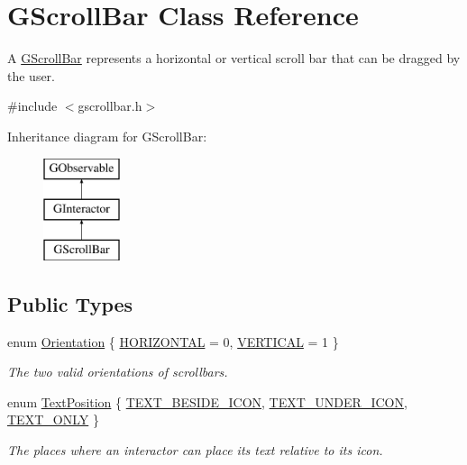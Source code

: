 \hypertarget{classGScrollBar}{}\section{G\+Scroll\+Bar Class Reference}
\label{classGScrollBar}


A \mbox{\hyperlink{classGScrollBar}{G\+Scroll\+Bar}} represents a horizontal or vertical scroll bar that can be dragged by the user.  




{\ttfamily \#include $<$gscrollbar.\+h$>$}

Inheritance diagram for G\+Scroll\+Bar\+:\begin{figure}[H]
\begin{center}
\leavevmode
\includegraphics[height=3.000000cm]{classGScrollBar}
\end{center}
\end{figure}
\subsection*{Public Types}
\begin{DoxyCompactItemize}
\item 
enum \mbox{\hyperlink{classGScrollBar_a871118a09520247c78a71ecd7b0abd58}{Orientation}} \{ \mbox{\hyperlink{classGScrollBar_a871118a09520247c78a71ecd7b0abd58a4dd51ad73508d6fc83a502966779e48e}{H\+O\+R\+I\+Z\+O\+N\+T\+AL}} = 0, 
\mbox{\hyperlink{classGScrollBar_a871118a09520247c78a71ecd7b0abd58a1a88641fcd39f2ed3e58a18526e97138}{V\+E\+R\+T\+I\+C\+AL}} = 1
 \}
\begin{DoxyCompactList}\small\item\em The two valid orientations of scrollbars. \end{DoxyCompactList}\item 
enum \mbox{\hyperlink{classGInteractor_a8e0d441725a81d2bbdebbea09078260e}{Text\+Position}} \{ \mbox{\hyperlink{classGInteractor_a8e0d441725a81d2bbdebbea09078260ea4cd6f2e7d5a08d6f4dc052df2358f774}{T\+E\+X\+T\+\_\+\+B\+E\+S\+I\+D\+E\+\_\+\+I\+C\+ON}}, 
\mbox{\hyperlink{classGInteractor_a8e0d441725a81d2bbdebbea09078260eaa88490f63d8de68d44c83bdb2ecde3b3}{T\+E\+X\+T\+\_\+\+U\+N\+D\+E\+R\+\_\+\+I\+C\+ON}}, 
\mbox{\hyperlink{classGInteractor_a8e0d441725a81d2bbdebbea09078260ea39a6f388a30ac4fefb6eb13e846bc9f2}{T\+E\+X\+T\+\_\+\+O\+N\+LY}}
 \}
\begin{DoxyCompactList}\small\item\em The places where an interactor can place its text relative to its icon. \end{DoxyCompactList}\end{DoxyCompactItemize}
